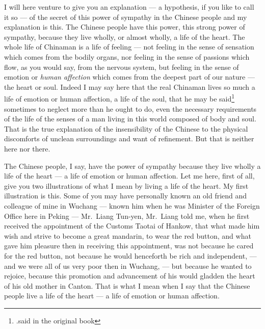 I will here venture to give you an explanation --- a hypothesis, if you like to call it so --- of the secret of this power of sympathy in the Chinese people and my explanation is this.
The Chinese people have this power, this strong power of sympathy, because they live wholly, or almost wholly, a life of the heart.
The whole life of Chinaman is a life of feeling --- not feeling in the sense of sensation which comes from the bodily organs, nor feeling in the sense of passions which flow, as you would say, from the nervous system, but feeling in the sense of emotion or \emph{human affection} which comes from the deepest part of our nature --- the heart or soul.
Indeed I may say here that the real Chinaman lives so much a life of emotion or human affection, a life of the soul, that he may be said\footnote{.said in the original book} sometimes to neglect more than he ought to do, even the necessary requirements of the life of the senses of a man living in this world composed of body and soul.
That is the true explanation of the insensibility of the Chinese to the physical discomforts of unclean surroundings and want of refinement.
But that is neither here nor there.

The Chinese people, I say, have the power of sympathy because they live wholly a life of the heart --- a life of emotion or human affection.
Let me here, first of all, give you two illustrations of what I mean by living a life of the heart.
My first illustration is this.
Some of you may have personally known an old friend and colleague of mine in Wuchang --- known him when he was Minister of the Foreign Office here in Peking --- Mr.~Liang Tun-yen,  Mr.~Liang told me, when he first received the appointment of the Customs Taotai of Hankow,  that what made him wish and strive to become a great mandarin, to wear the red button, and what gave him pleasure then in receiving this appointment, was not because he cared for the red button, not because he would henceforth be rich and independent, --- and we were all of us very poor then in Wuchang, --- but because he wanted to rejoice, because this promotion and advancement of his would gladden the heart of his old mother in Canton. 
That is what I mean when I say that the Chinese people live a life of the heart --- a life of emotion or human affection.

